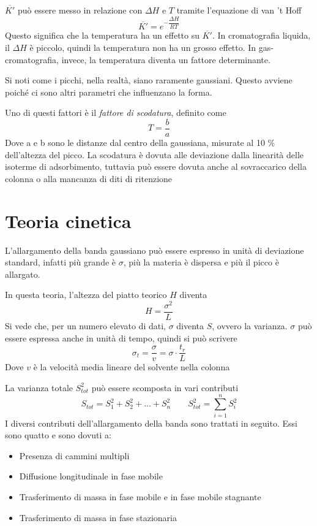
$\overline{K'}$ può essere messo in relazione con $\Delta H$ e $T$ tramite l'equazione di  van 't Hoff
\[
\overline{K'} = e^{-\dfrac{\Delta H}{RT}}
\]
Questo significa che la temperatura ha un effetto su $\overline{K'}$.
In cromatografia liquida, il $\Delta H$ è piccolo, quindi la temperatura non ha un grosso effetto.
In gas-cromatografia, invece, la temperatura diventa un fattore determinante.

Si noti come i picchi, nella realtà, siano raramente gaussiani. Questo avviene poiché ci sono altri parametri che influenzano la forma.\par
Uno di questi fattori è il \emph{fattore di scodatura}, definito come
\[
T = \frac{b}{a}
\]
Dove a e b sono le distanze dal centro della gaussiana, misurate al 10 \% dell'altezza del picco.
La scodatura è dovuta alle deviazione dalla linearità delle isoterme di adsorbimento, tuttavia può essere dovuta anche al sovraccarico della colonna o alla mancanza di diti di ritenzione


\section{Teoria cinetica}
L'allargamento della banda gaussiano può essere espresso in unità di deviazione standard, infatti più grande è $\sigma$, più la materia è dispersa e più il picco è allargato.

In questa teoria, l'altezza del piatto teorico $H$ diventa
\[
H = \frac{\sigma^2}{L} 
\]
Si vede che, per un numero elevato di dati, $\sigma$ diventa $S$, ovvero la varianza. $\sigma$ può essere espressa anche in unità di tempo, quindi si può scrivere
\[
\sigma_t = \frac{\sigma}{v} = \sigma \cdot \frac{t_r}{L} 
\]
Dove $v$ è la velocità media lineare del solvente nella colonna

La varianza totale $S^2_{tot}$ può essere scomposta in vari contributi
\[
S_{tot} = S_1^2 + S_2^2 + \dots + S_n^2 \qquad S^2_{tot} = \sum_{i=1}^n S_i^2
\]
I diversi contributi dell'allargamento della banda sono trattati in seguito. Essi sono quatto e sono dovuti a:
\begin{itemize}
\item Presenza di cammini multipli
\item Diffusione longitudinale in fase mobile
\item Trasferimento di massa in fase mobile e in fase mobile stagnante
\item Trasferimento di massa in fase stazionaria
\end{itemize}

